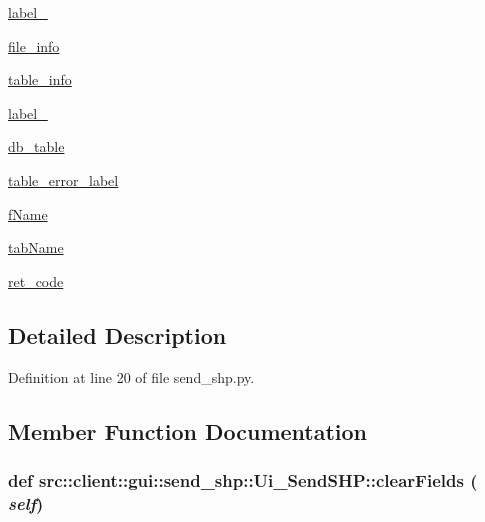 \begin{DoxyCompactItemize}
\item 
\hyperlink{classsrc_1_1client_1_1gui_1_1send__shp_1_1Ui__SendSHP_a92420cc9a7d96d3e6939e856442587a7}{label\_}
\item 
\hyperlink{classsrc_1_1client_1_1gui_1_1send__shp_1_1Ui__SendSHP_a26a4e86da3ee27aeecf0388ad6e5cc9d}{file\_\-info}
\item 
\hyperlink{classsrc_1_1client_1_1gui_1_1send__shp_1_1Ui__SendSHP_a9ad2c5dce3bb4f5b86bfa01ef574bdcc}{table\_\-info}
\item 
\hyperlink{classsrc_1_1client_1_1gui_1_1send__shp_1_1Ui__SendSHP_ade6d7efcc96ddb8e6be83a38a6724929}{label\_}
\item 
\hyperlink{classsrc_1_1client_1_1gui_1_1send__shp_1_1Ui__SendSHP_a90b56feeb7f890a314388d4b5b27e749}{db\_\-table}
\item 
\hyperlink{classsrc_1_1client_1_1gui_1_1send__shp_1_1Ui__SendSHP_a0852e9fe09be03d2e8e467b9c7d56904}{table\_\-error\_\-label}
\item 
\hyperlink{classsrc_1_1client_1_1gui_1_1send__shp_1_1Ui__SendSHP_a9278339be273dbc1225cb54216668246}{fName}
\item 
\hyperlink{classsrc_1_1client_1_1gui_1_1send__shp_1_1Ui__SendSHP_a9c321210873cded532ddac0a0e3b8c5e}{tabName}
\item 
\hyperlink{classsrc_1_1client_1_1gui_1_1send__shp_1_1Ui__SendSHP_ad0c7f1f2079a5feb40d8174366ae6d5c}{ret\_\-code}
\end{DoxyCompactItemize}


\subsection{Detailed Description}


Definition at line 20 of file send\_\-shp.py.



\subsection{Member Function Documentation}
\hypertarget{classsrc_1_1client_1_1gui_1_1send__shp_1_1Ui__SendSHP_a33f45a52ff4cb3d3bbf6613845da3938}{
\subsubsection[{clearFields}]{\setlength{\rightskip}{0pt plus 5cm}def src::client::gui::send\_\-shp::Ui\_\-SendSHP::clearFields ( {\em self})}}
\label{classsrc_1_1client_1_1gui_1_1send__shp_1_1Ui__SendSHP_a33f45a52ff4cb3d3bbf6613845da3938}


